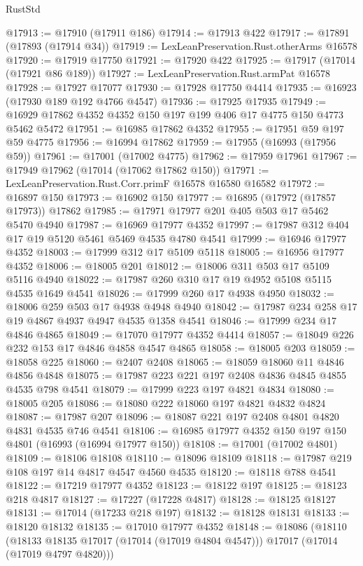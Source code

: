 \begin{lexlean}{RustStd}
\begin{coremodule}
{\begin{coremodule}
{{{{{{{{{{{{{{{{{{{{{{{{{{{{{{{{{{{{{{{{{{{{{{{{{{{{{{{@17913 := @17910 (@17911 @186)
@17914 := @17913 @422
@17917 := @17891 (@17893 (@17914 @34))
@17919 := LexLeanPreservation.Rust.otherArms @16578
@17920 := @17919 @17750
@17921 := @17920 @422
@17925 := @17917 (@17014 (@17921 @86 @189))
@17927 := LexLeanPreservation.Rust.armPat @16578
@17928 := @17927 @17077
@17930 := @17928 @17750 @4414
@17935 := @16923 (@17930 @189 @192 @4766 @4547)
@17936 := @17925 @17935
@17949 := @16929 @17862 @4352 @4352 @150 @197 @199 @406 @17 @4775 @150 @4773 @5462 @5472
@17951 := @16985 @17862 @4352
@17955 := @17951 @59 @197 @59 @4775
@17956 := @16994 @17862
@17959 := @17955 (@16993 (@17956 @59))
@17961 := @17001 (@17002 @4775)
@17962 := @17959 @17961
@17967 := @17949 @17962 (@17014 (@17062 @17862 @150))
@17971 := LexLeanPreservation.Rust.Corr.primF @16578 @16580 @16582
@17972 := @16897 @150
@17973 := @16902 @150
@17977 := @16895 (@17972 (@17857 @17973)) @17862
@17985 := @17971 @17977 @201 @405 @503 @17 @5462 @5470 @4940
@17987 := @16969 @17977 @4352
@17997 := @17987 @312 @404 @17 @19 @5120 @5461 @5469 @4535 @4780 @4541
@17999 := @16946 @17977 @4352
@18003 := @17999 @312 @17 @5109 @5118
@18005 := @16956 @17977 @4352
@18006 := @18005 @201
@18012 := @18006 @311 @503 @17 @5109 @5116 @4940
@18022 := @17987 @260 @310 @17 @19 @4952 @5108 @5115 @4535 @1649 @4541
@18026 := @17999 @260 @17 @4938 @4950
@18032 := @18006 @259 @503 @17 @4938 @4948 @4940
@18042 := @17987 @234 @258 @17 @19 @4867 @4937 @4947 @4535 @1358 @4541
@18046 := @17999 @234 @17 @4846 @4865
@18049 := @17070 @17977 @4352 @4414
@18057 := @18049 @226 @232 @153 @17 @4846 @4858 @4547 @4865
@18058 := @18005 @203
@18059 := @18058 @225
@18060 := @2407 @2408
@18065 := @18059 @18060 @11 @4846 @4856 @4848
@18075 := @17987 @223 @221 @197 @2408 @4836 @4845 @4855 @4535 @798 @4541
@18079 := @17999 @223 @197 @4821 @4834
@18080 := @18005 @205
@18086 := @18080 @222 @18060 @197 @4821 @4832 @4824
@18087 := @17987 @207
@18096 := @18087 @221 @197 @2408 @4801 @4820 @4831 @4535 @746 @4541
@18106 := @16985 @17977 @4352 @150 @197 @150 @4801 (@16993 (@16994 @17977 @150))
@18108 := @17001 (@17002 @4801)
@18109 := @18106 @18108
@18110 := @18096 @18109
@18118 := @17987 @219 @108 @197 @14 @4817 @4547 @4560 @4535
@18120 := @18118 @788 @4541
@18122 := @17219 @17977 @4352
@18123 := @18122 @197
@18125 := @18123 @218 @4817
@18127 := @17227 (@17228 @4817)
@18128 := @18125 @18127
@18131 := @17014 (@17233 @218 @197)
@18132 := @18128 @18131
@18133 := @18120 @18132
@18135 := @17010 @17977 @4352
@18148 := @18086
    (@18110
      (@18133 @18135 @17017 (@17014 (@17019 @4804 @4547)))
      @17017
      (@17014 (@17019 @4797 @4820)))
}}}}}}}}}}}}}}}}}}}}}}}}}}}}}}}}}}}}}}}}}}}}}}}}}}}}}}}
\end{coremodule}}
\end{coremodule}
\end{lexlean}
